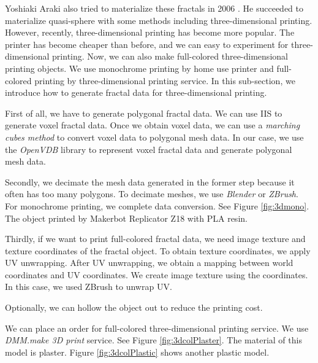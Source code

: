 Yoshiaki Araki also tried to materialize these fractals in 2006
\cite{araki2006materializing}.
He succeeded to materialize quasi-sphere with some methods including
three-dimensional printing.
However, recently, three-dimensional printing has become more popular.
The printer has become cheaper than before, and we can easy to
experiment for three-dimensional printing.
Now, we can also make full-colored three-dimensional printing objects.
We use monochrome printing by home use printer and full-colored
printing by three-dimensional printing service.
In this sub-section, we introduce how to generate fractal data for
three-dimensional printing.

First of all, we have to generate polygonal fractal data.
We can use IIS to generate voxel fractal data.
Once we obtain voxel data, we can use a \textit{marching cubes method}
to convert voxel data to polygonal mesh data.
In our case, we use the \textit{OpenVDB} library to represent voxel
fractal data and generate polygonal mesh data.

Secondly, we decimate the mesh data generated in the former step because
it often has too many polygons. 
To decimate meshes, we use \textit{Blender} or \textit{ZBrush}.
For monochrome printing, we complete data conversion.
See Figure \ref{fig:3dmono}.
The object printed by Makerbot Replicator Z18 with PLA resin.

Thirdly, if we want to print full-colored fractal data, we need
image texture and texture coordinates of the fractal object.
To obtain texture coordinates, we apply UV unwrapping.
After UV unwrapping, we obtain a mapping between world coordinates
and UV coordinates.
We create image texture using the coordinates. 
In this case, we used ZBrush to unwrap UV.

Optionally, we can hollow the object out to reduce the printing cost.

We can place an order for full-colored three-dimensional printing service.
We use \textit{DMM.make 3D print} service.
See Figure \ref{fig:3dcolPlaster}. The material of this model is plaster.
Figure \ref{fig:3dcolPlastic} shows another plastic model.
